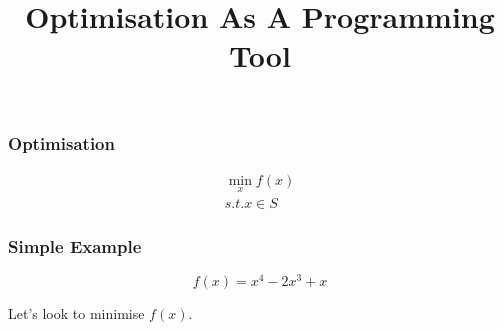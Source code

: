 
\title{Optimisation As A Programming Tool}

\frame{\maketitle}

\begin{frame}[fragile]
\frametitle{Optimisation}

\begin{align*}
\min_x f(x)\\
s.t. x \in S
\end{align*}

\end{frame}

\begin{frame}[fragile]
\frametitle{Simple Example}

\[
f(x) = x^4-2x^3+x
\]

Let's look to minimise $f(x)$.

\end{frame}


